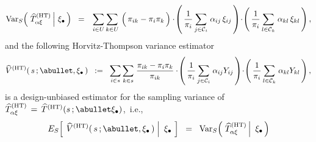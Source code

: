\begin{itemize}
    \begin{equation*}
    \Var_{S}\!\left(\,
        \left.
        \widehat{T}^{\textnormal{(HT)}}_{\alpha\xi}
        \,\right\vert\!\!
        \begin{array}{c} \xi_{\bullet} \end{array}
        \!\!\right)
    \;\; = \;\;\,
        \underset{i \in U}{\sum}\,
        \underset{k \in U}{\sum}\,
        \left(\,\pi_{ik} \overset{{\color{white}.}}{-} \pi_{i}\pi_{k}\,\right)
        \cdot\!
        \left(\,
            \dfrac{1}{\pi_{i}}\,
            \underset{j\in\mathcal{C}_{i}}{\sum}\;\alpha_{ij}\,\xi_{ij}
            \,\right)
        \!\cdot\!
        \left(\,
            \dfrac{1}{\pi_{i}}\,
            \underset{l\in\mathcal{C}_{k}}{\sum}\;\alpha_{kl}\,\xi_{kl}
            \,\right),
    \end{equation*}
    and the following Horvitz-Thompson variance estimator
    \begin{equation*}
    \widehat{V}^{\textnormal{(HT)}}(\,s\,;\abullet,\xi_{\bullet}\,)
    \;\; := \;\;
        \underset{i \in s}{\sum}\,
        \underset{k \in s}{\sum}\;
        \dfrac{\pi_{ik} - \pi_{i}\pi_{k}}{\pi_{ik}}
        \cdot\!
        \left(\,
            \dfrac{1}{\pi_{i}}\,
            \underset{j\in\mathcal{C}_{i}}{\sum}\;\alpha_{ij}Y_{ij}
            \,\right)
        \!\cdot\!
        \left(\,
            \dfrac{1}{\pi_{i}}\,
            \underset{l\in\mathcal{C}_{k}}{\sum}\;\alpha_{kl}Y_{kl}
            \,\right),
    \end{equation*}
    is a design-unbiased estimator for the sampling variance of
    \,$
    \widehat{T}^{\textnormal{(HT)}}_{\alpha\xi}
    \,=\,
        \widehat{T}^{\textnormal{(HT)}}(s\,;\abullet\xi_{\bullet})
    $,\,
    i.e.,
    \begin{equation*}
    E_{S}\!\left[\;
        \left.
        \widehat{V}^{\textnormal{(HT)}}(\,s\,;\abullet,\xi_{\bullet}\,)
        \;\right\vert\!
        \begin{array}{c} \xi_{\bullet} \end{array}
        \!\right]
    \;\; = \;\;
        \Var_{S}\!\left(\,
            \left.
            \widehat{T}^{\textnormal{(HT)}}_{\alpha\xi} %
            \,\right\vert\!
            \begin{array}{c} \xi_{\bullet} \end{array}
            \!\!\right)
    \end{equation*}

\end{itemize}
